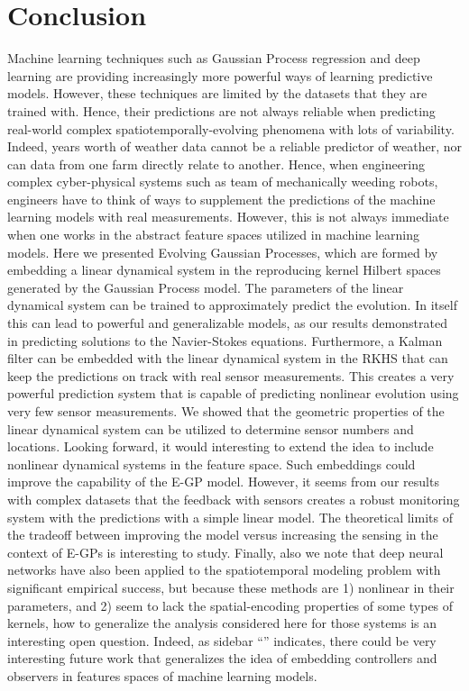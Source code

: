\section{Conclusion}\label{sec:conclusion}
Machine learning techniques such as Gaussian Process regression and deep learning are providing increasingly more powerful ways of learning predictive models. However, these techniques are limited by the datasets that they are trained with. Hence, their predictions are not always reliable when predicting real-world complex spatiotemporally-evolving phenomena with lots of variability. Indeed, years worth of weather data cannot be a reliable predictor of weather, nor can data from one farm directly relate to another. Hence, when engineering complex cyber-physical systems such as team of mechanically weeding robots, engineers have to think of ways to supplement the predictions of the machine learning models with real measurements. However, this is not always immediate when one works in the abstract feature spaces utilized in machine learning models. Here we presented Evolving Gaussian Processes, which are formed by embedding a linear dynamical system in the %
reproducing kernel Hilbert spaces generated by the Gaussian Process model. The parameters of the linear dynamical system can be trained to approximately predict the evolution. In itself this can lead to powerful and generalizable models, as our results demonstrated in predicting solutions to the Navier-Stokes equations. Furthermore, a Kalman filter can be embedded with the linear dynamical system in the RKHS that can keep the predictions on track with real sensor measurements. This creates a very powerful prediction system that is capable of predicting nonlinear evolution using very few sensor measurements. We showed that the geometric properties of the linear dynamical system can be utilized to determine sensor numbers and locations. Looking forward, it would interesting to extend the idea to include nonlinear dynamical systems in the feature space. Such embeddings could improve the capability of the E-GP model. However, it seems from our results with complex datasets that the feedback with sensors creates a robust monitoring system with the predictions with a simple linear model. The theoretical limits of the tradeoff between improving the model versus increasing the sensing in the context of E-GPs is interesting to study. Finally, also we note that deep neural networks have also been applied to the spatiotemporal modeling problem with significant empirical success\cite{tran2015learning}, but because these methods are 1) nonlinear in their parameters, and 2) seem to lack the spatial-encoding properties of some types of kernels, how to generalize the analysis considered here for those systems is an interesting open question. Indeed, as sidebar ``'' indicates, there could be very interesting future work that generalizes the idea of embedding controllers and observers in features spaces of machine learning models. %


